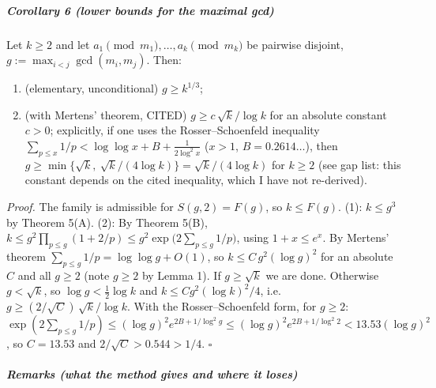 \documentclass[11pt,a4paper]{article}
\providecommand{\tightlist}{\setlength{\itemsep}{0pt}\setlength{\parskip}{0pt}}
\begin{document}
\subparagraph{Corollary 6 (lower bounds for the maximal
gcd)}\label{corollary-6-lower-bounds-for-the-maximal-gcd}

Let \(k\ge2\) and let \(a_1\pmod{m_1},\dots,a_k\pmod{m_k}\) be pairwise
disjoint, \(g:=\max_{i<j}\gcd(m_i,m_j)\). Then:

\begin{enumerate}
\def\labelenumi{\arabic{enumi}.}
\tightlist
\item
  (elementary, unconditional) \(g\ge k^{1/3}\);
\item
  (with Mertens' theorem, CITED) \(g\ge c\,\sqrt{k}/\log k\) for an
  absolute constant \(c>0\); explicitly, if one uses the
  Rosser--Schoenfeld inequality
  \(\sum_{p\le x}1/p<\log\log x+B+\frac{1}{2\log^2 x}\) (\(x>1\),
  \(B=0.2614\ldots\)), then
  \(g\ge\min\{\sqrt k,\ \sqrt k/(4\log k)\}=\sqrt k/(4\log k)\) for
  \(k\ge 2\) (see gap list: this constant depends on the cited
  inequality, which I have not re-derived).
\end{enumerate}

\emph{Proof.} The family is admissible for \(S(g,2)=F(g)\), so
\(k\le F(g)\). (1): \(k\le g^3\) by Theorem 5(A). (2): By Theorem 5(B),
\(k\le g^2\prod_{p\le g}(1+2/p)\le g^2\exp\big(2\sum_{p\le g}1/p\big)\),
using \(1+x\le e^x\). By Mertens' theorem
\(\sum_{p\le g}1/p=\log\log g+O(1)\), so \(k\le C\,g^2(\log g)^2\) for
an absolute \(C\) and all \(g\ge2\) (note \(g\ge2\) by Lemma 1). If
\(g\ge\sqrt k\) we are done. Otherwise \(g<\sqrt k\), so
\(\log g<\tfrac12\log k\) and \(k\le C g^2(\log k)^2/4\),
i.e.~\(g\ge (2/\sqrt C)\,\sqrt k/\log k\). With the Rosser--Schoenfeld
form, for \(g\ge2\):
\(\exp(2\sum_{p\le g}1/p)\le (\log g)^2 e^{2B+1/\log^2 g}\le (\log g)^2e^{2B+1/\log^2 2}<13.53(\log g)^2\),
so \(C=13.53\) and \(2/\sqrt{C}>0.544>1/4\). \(\square\)

\subparagraph{Remarks (what the method gives and where it
loses)}\label{remarks-what-the-method-gives-and-where-it-loses}
\end{document}
